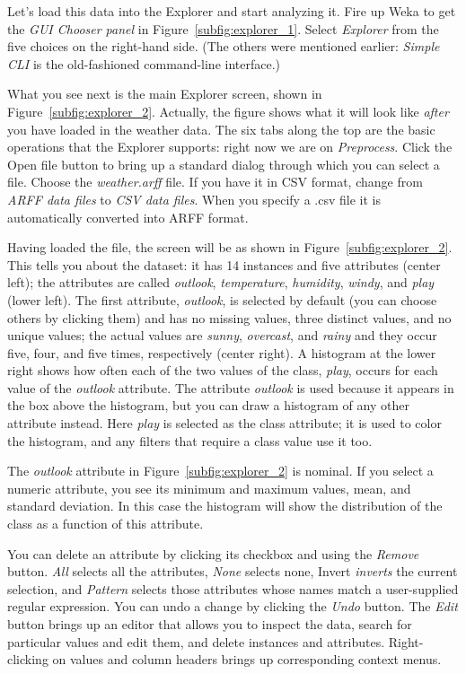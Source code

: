 Let's load this data into the Explorer and start analyzing it. Fire up
Weka to get the \textit{GUI Chooser panel} in Figure~\ref{subfig:explorer_1}. Select
\textit{Explorer} from the five choices on the right-hand side. (The
others were mentioned earlier: \textit{Simple CLI} is the
old-fashioned command-line interface.)

What you see next is the main Explorer screen, shown in
Figure~\ref{subfig:explorer_2}. Actually, the figure shows what it will
look like \textit{after} you have loaded in the weather data. The six
tabs along the top are the basic operations that the Explorer
supports: right now we are on \textit{Preprocess}. Click the Open file
button to bring up a standard dialog through which you can select a
file. Choose the \textit{weather.arff} file. If you have it in CSV
format, change from \textit{ARFF data files} to \textit{CSV data
  files}. When you specify a .csv file it is automatically converted
into ARFF format.

Having loaded the file, the screen will be as shown in
Figure~\ref{subfig:explorer_2}. This tells you about the dataset: it
has 14 instances and five attributes (center left); the attributes are
called \textit{outlook}, \textit{temperature}, \textit{humidity},
\textit{windy}, and \textit{play} (lower left). The first attribute,
\textit{outlook}, is selected by default (you can choose others by
clicking them) and has no missing values, three distinct values, and
no unique values; the actual values are \textit{sunny},
\textit{overcast}, and \textit{rainy} and they occur five, four, and
five times, respectively (center right). A histogram at the lower
right shows how often each of the two values of the class,
\textit{play}, occurs for each value of the \textit{outlook}
attribute. The attribute \textit{outlook} is used because it appears
in the box above the histogram, but you can draw a histogram of any
other attribute instead. Here \textit{play} is selected as the class
attribute; it is used to color the histogram, and any filters that
require a class value use it too.

The \textit{outlook} attribute in Figure~\ref{subfig:explorer_2} is
nominal. If you select a numeric attribute, you see its minimum and
maximum values, mean, and standard deviation. In this case the
histogram will show the distribution of the class as a function of
this attribute.

You can delete an attribute by clicking its checkbox and using the
\textit{Remove} button. \textit{All} selects all the attributes,
\textit{None} selects none, Invert \textit{inverts} the current
selection, and \textit{Pattern} selects those attributes whose names
match a user-supplied regular expression. You can undo a change by
clicking the \textit{Undo} button. The \textit{Edit} button brings up
an editor that allows you to inspect the data, search for particular
values and edit them, and delete instances and
attributes. Right-clicking on values and column headers brings up
corresponding context menus.

